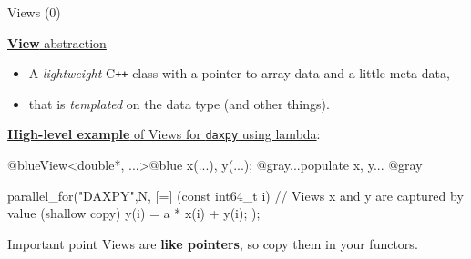 \begin{frame}[fragile]{Views (0)}

  \ul{\textbf{View} abstraction}
  \begin{itemize}
  \item {A \textit{lightweight} C\texttt{++} class with a pointer to array data and a little meta-data,}
  \item {that is \textit{templated} on the data type (and other things).}
  \end{itemize}

  \vspace{5pt}

  \ul{\textbf{High-level example} of Views for \texttt{daxpy} using lambda}:

  \begin{code}[frame=single, keywords={}]
@blueView<double*, ...>@blue x(...), y(...);
@gray...populate x, y... @gray

parallel_for("DAXPY",N, [=] (const int64_t i) {
    // Views x and y are captured by value (shallow copy)
    y(i) = a * x(i) + y(i);
  });
  \end{code}

  \pause
  \vspace{0pt}

  \begin{block}{Important point}
    Views are \textbf{like pointers}, so copy them in your functors.
  \end{block}

  \vspace{5pt}

\end{frame}


